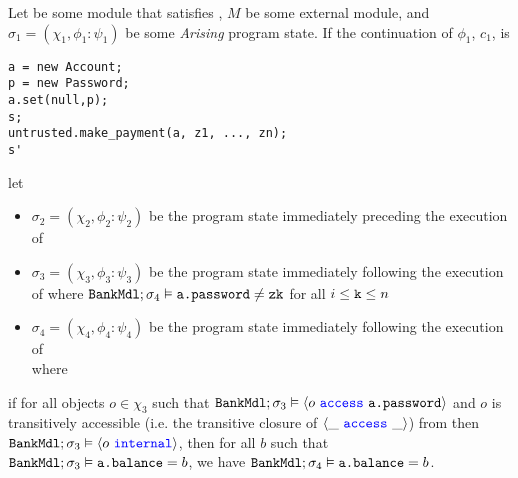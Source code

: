 \begin{theorem}
\label{thm:safety}
Let  be some module that satisfies \SrobustB, 
$M$ be some external module, and $\sigma_1 = (\chi_1, \phi_1 : \psi_1)$ be some \textit{Arising} program state. If the continuation of $\phi_1$, $c_1$, is
\begin{verbatim}
a = new Account; 
p = new Password; 
a.set(null,p); 
s; 
untrusted.make_payment(a, z1, ..., zn); 
s'
\end{verbatim}
let 
\begin{itemize}
\item
$\sigma_2 = (\chi_2, \phi_2 : \psi_2)$ be the program state immediately preceding the execution of 
\item
$\sigma_3 = (\chi_3, \phi_3 : \psi_3)$ be the program state immediately following the execution of  where ${\texttt{BankMdl}};\sigma_4 \vDash {\texttt{a.password}} \neq {\texttt{zk}}$ for all $i \leq {\texttt{k}} \leq n$
\item
$\sigma_4 = (\chi_4, \phi_4 : \psi_4)$ be the program state immediately following the execution of\\  where 
\end{itemize}
if for all objects $o \in \chi_3$ such that ${\texttt{BankMdl}}; \sigma_3 \vDash \langle o\ {\color{blue}\texttt{access}}\ {\texttt{a.password}} \rangle$ and $o$ is transitively accessible (i.e. the transitive closure of $\langle \_\ {\color{blue}\texttt{access}}\ \_ \rangle$) from 
then ${\texttt{BankMdl}}; \sigma_3 \vDash \langle o\ {\color{blue}\texttt{internal}}\rangle$,
then for all $b$ such that ${\texttt{BankMdl}}; \sigma_3 \vDash {\texttt{a.balance}}=b$, we have ${\texttt{BankMdl}};\sigma_4 \vDash {\texttt{a.balance}} = b$.
\end{theorem}
